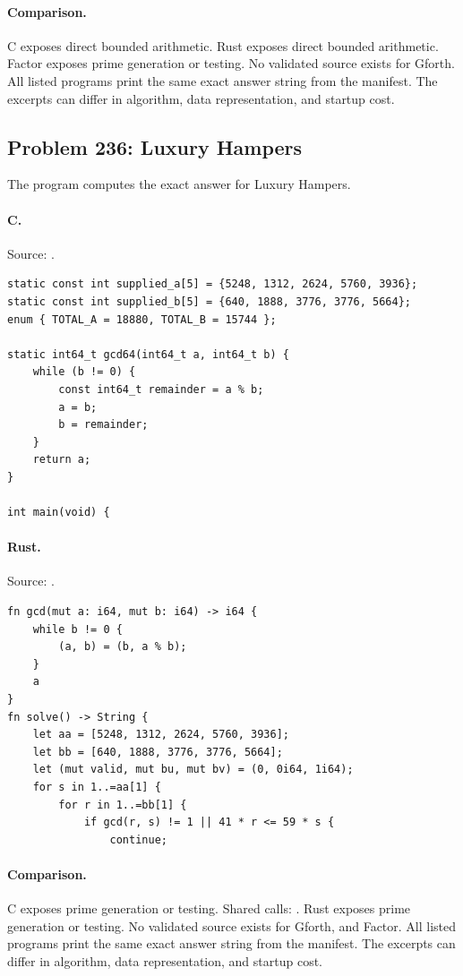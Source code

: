 \paragraph{Comparison.}
C exposes direct bounded arithmetic. Rust exposes direct bounded arithmetic. Factor exposes prime generation or testing.
No validated source exists for Gforth.
All listed programs print the same exact answer string from the manifest. The excerpts can differ in algorithm, data representation, and startup cost.

\subsection{Problem 236: Luxury Hampers}
\label{walkthrough:p236}
The program computes the exact answer for Luxury Hampers.

\paragraph{C.} Source: .
\begin{lstlisting}
static const int supplied_a[5] = {5248, 1312, 2624, 5760, 3936};
static const int supplied_b[5] = {640, 1888, 3776, 3776, 5664};
enum { TOTAL_A = 18880, TOTAL_B = 15744 };

static int64_t gcd64(int64_t a, int64_t b) {
    while (b != 0) {
        const int64_t remainder = a % b;
        a = b;
        b = remainder;
    }
    return a;
}

int main(void) {
\end{lstlisting}

\paragraph{Rust.} Source: .
\begin{lstlisting}
fn gcd(mut a: i64, mut b: i64) -> i64 {
    while b != 0 {
        (a, b) = (b, a % b);
    }
    a
}
fn solve() -> String {
    let aa = [5248, 1312, 2624, 5760, 3936];
    let bb = [640, 1888, 3776, 3776, 5664];
    let (mut valid, mut bu, mut bv) = (0, 0i64, 1i64);
    for s in 1..=aa[1] {
        for r in 1..=bb[1] {
            if gcd(r, s) != 1 || 41 * r <= 59 * s {
                continue;
\end{lstlisting}

\paragraph{Comparison.}
C exposes prime generation or testing. Shared calls: \texttt{}. Rust exposes prime generation or testing.
No validated source exists for Gforth, and Factor.
All listed programs print the same exact answer string from the manifest. The excerpts can differ in algorithm, data representation, and startup cost.

